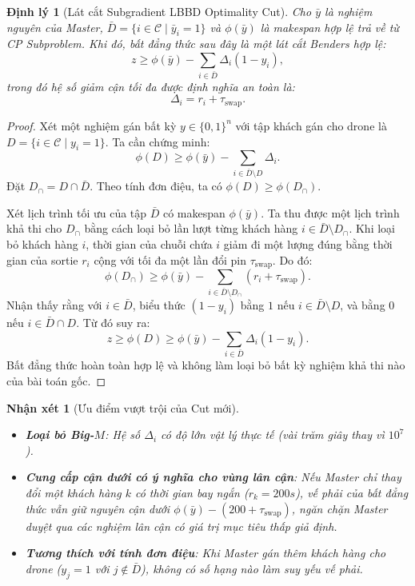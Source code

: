 \documentclass[12pt,a4paper]{article}
\newtheorem{theorem}{Định lý}
\newtheorem{remark}{Nhận xét}
\newcommand{\C}{\mathcal{C}}
\newcommand{\swap}{\tau_{\mathrm{swap}}}
\begin{document}
\begin{theorem}[Lát cắt Subgradient LBBD Optimality Cut]
\label{thm:subgradient-cut}
Cho $\bar{y}$ là nghiệm nguyên của Master, $\bar{D} = \{i \in \C \mid \bar{y}_i = 1\}$ và $\phi(\bar{y})$ là makespan hợp lệ trả về từ CP Subproblem. Khi đó, bất đẳng thức sau đây là một lát cắt Benders hợp lệ:
\begin{equation}
    z \ge \phi(\bar{y}) - \sum_{i \in \bar{D}} \Delta_i (1 - y_i),
    \label{eq:strong-optimality-cut}
\end{equation}
trong đó hệ số giảm cận tối đa được định nghĩa an toàn là:
\begin{equation}
    \Delta_i = r_i + \swap.
    \label{eq:delta-def}
\end{equation}
\end{theorem}

\begin{proof}
Xét một nghiệm gán bất kỳ $y \in \{0, 1\}^n$ với tập khách gán cho drone là $D = \{i \in \C \mid y_i = 1\}$. Ta cần chứng minh:
\[
    \phi(D) \ge \phi(\bar{y}) - \sum_{i \in \bar{D} \setminus D} \Delta_i.
\]
Đặt $D_{\cap} = D \cap \bar{D}$. Theo tính đơn điệu, ta có $\phi(D) \ge \phi(D_{\cap})$. 

Xét lịch trình tối ưu của tập $\bar{D}$ có makespan $\phi(\bar{y})$. Ta thu được một lịch trình khả thi cho $D_{\cap}$ bằng cách loại bỏ lần lượt từng khách hàng $i \in \bar{D} \setminus D_{\cap}$. Khi loại bỏ khách hàng $i$, thời gian của chuỗi chứa $i$ giảm đi một lượng đúng bằng thời gian của sortie $r_i$ cộng với tối đa một lần đổi pin $\swap$. Do đó:
\[
    \phi(D_{\cap}) \ge \phi(\bar{y}) - \sum_{i \in \bar{D} \setminus D_{\cap}} (r_i + \swap).
\]
Nhận thấy rằng với $i \in \bar{D}$, biểu thức $(1 - y_i)$ bằng $1$ nếu $i \in \bar{D} \setminus D$, và bằng $0$ nếu $i \in \bar{D} \cap D$. Từ đó suy ra:
\[
    z \ge \phi(D) \ge \phi(\bar{y}) - \sum_{i \in \bar{D}} \Delta_i (1 - y_i).
\]
Bất đẳng thức hoàn toàn hợp lệ và không làm loại bỏ bất kỳ nghiệm khả thi nào của bài toán gốc.
\end{proof}

\begin{remark}[Ưu điểm vượt trội của Cut mới]
\begin{itemize}[leftmargin=2em]
    \item \textbf{Loại bỏ Big-$M$}: Hệ số $\Delta_i$ có độ lớn vật lý thực tế (vài trăm giây thay vì $10^7$).
    \item \textbf{Cung cấp cận dưới có ý nghĩa cho vùng lân cận}: Nếu Master chỉ thay đổi một khách hàng $k$ có thời gian bay ngắn ($r_k = 200s$), vế phải của bất đẳng thức vẫn giữ nguyên cận dưới $\phi(\bar{y}) - (200 + \swap)$, ngăn chặn Master duyệt qua các nghiệm lân cận có giá trị mục tiêu thấp giả định.
    \item \textbf{Tương thích với tính đơn điệu}: Khi Master gán thêm khách hàng cho drone ($y_j = 1$ với $j \notin \bar{D}$), không có số hạng nào làm suy yếu vế phải.
\end{itemize}
\end{remark}
\end{document}
